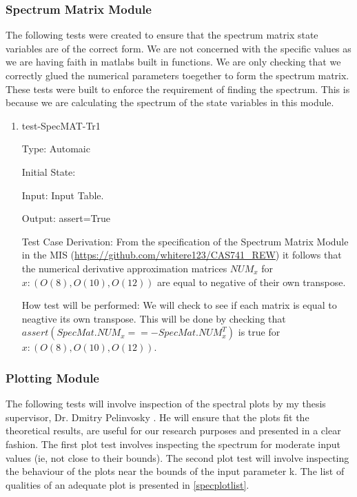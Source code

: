 \documentclass[12pt, titlepage]{article}
\begin{document}
\subsubsection{Spectrum Matrix Module}

The following tests were created to ensure that the spectrum matrix state 
variables are of the correct form. We are not concerned with the specific 
values as we are having faith in matlabs  built in functions. We are only 
checking that we correctly glued the numerical parameters toegether
 to form the 
spectrum matrix. \\ 
These tests were built to enforce the requirement of finding the spectrum. This 
is because we are calculating the spectrum of the state variables in this 
module. \\ 

\begin{enumerate}				

	\item{test-SpecMAT-Tr1\\}
	
	Type: Automaic
	
	Initial State: 
	
	Input: Input Table.
	
	Output: assert=True
	
	Test Case Derivation: From the specification of the Spectrum Matrix Module 
	in the MIS 
	(\url{https://github.com/whitere123/CAS741_REW}) it follows that 
	the numerical derivative approximation matrices $NUM_{x}$ for 
	$x:(O(8),O(10),O(12))$ are equal to negative of their own transpose.
	
	How test will be performed: We will check to see if each matrix is 
	equal to neagtive its own transpose. This will be done by checking that 
	$assert( 
	SpecMat.NUM_{x} == -SpecMat.NUM_{x}^{T} ) $ is true for $x: ( O(8), 
	O(10), O(12) )$.  
	 
		
\end{enumerate} 

\subsubsection{Plotting Module} 

The following tests will involve inspection of the spectral plots by my thesis
supervisor, Dr. Dmitry Pelinvosky . He will ensure that the plots fit the
theoretical results, are useful for our research purposes and presented in a
clear fashion. The first plot test involves inspecting the spectrum for moderate
input values (ie, not close to their bounds). The second plot test will involve
inspecting the behaviour of the plots near the bounds of the input parameter
k. The list of qualities of an adequate plot is presented in \ref{specplotlist}.
\end{document}
